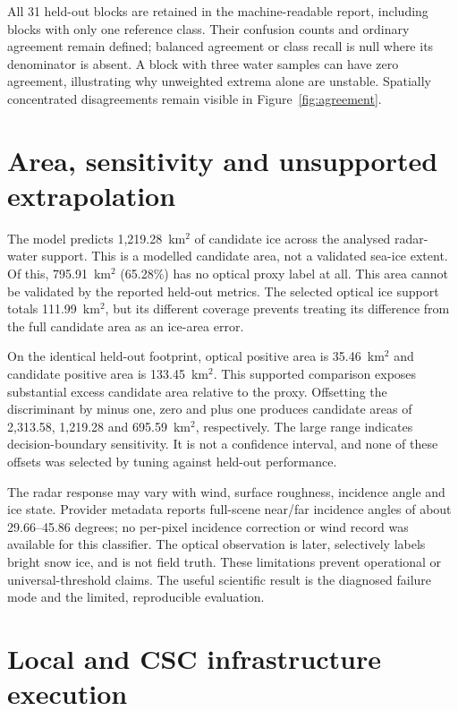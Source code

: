 All 31 held-out blocks are retained in the machine-readable report, including blocks with
only one reference class. Their confusion counts and ordinary agreement remain defined;
balanced agreement or class recall is null where its denominator is absent. A block with
three water samples can have zero agreement, illustrating why unweighted extrema alone
are unstable. Spatially concentrated disagreements remain visible in Figure~\ref{fig:agreement}.

\section{Area, sensitivity and unsupported extrapolation}

The model predicts 1,219.28~km$^2$ of candidate ice across the analysed radar-water support.
This is a modelled candidate area, not a validated sea-ice extent.
Of this, 795.91~km$^2$ (65.28\%) has no optical proxy label at all. This area cannot be
validated by the reported held-out metrics. The selected optical ice support totals
111.99~km$^2$, but its different coverage prevents treating its difference from the full
candidate area as an ice-area error.

On the identical held-out footprint, optical positive area is 35.46~km$^2$ and candidate
positive area is 133.45~km$^2$. This supported comparison exposes substantial excess
candidate area relative to the proxy. Offsetting the discriminant by minus one, zero and
plus one produces candidate areas of 2,313.58, 1,219.28 and 695.59~km$^2$, respectively.
The large range indicates decision-boundary sensitivity. It is not a confidence interval,
and none of these offsets was selected by tuning against held-out performance.

The radar response may vary with wind, surface roughness, incidence angle and ice state.
Provider metadata reports full-scene near/far incidence angles of about 29.66--45.86 degrees;
no per-pixel incidence correction or wind record was available for this classifier.
The optical observation is later, selectively labels bright snow ice, and is not field
truth. These limitations prevent operational or universal-threshold claims. The useful
scientific result is the diagnosed failure mode and the limited, reproducible evaluation.

\section{Local and CSC infrastructure execution}

